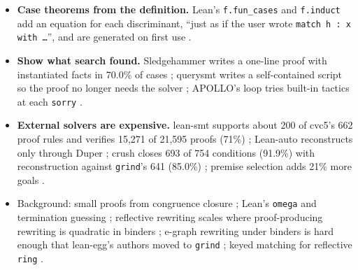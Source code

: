 \documentclass[11pt,a4paper]{article}
\newcommand{\code}[1]{\texttt{#1}}
\begin{document}
\begin{itemize}
  \item \textbf{Case theorems from the definition.} Lean's \code{f.fun\_cases} and
    \code{f.induct} add an equation for each discriminant, ``just as if the user wrote
    \code{match h : x with \ldots}'', and are generated on first use \cite{lean2026funind}.
  \item \textbf{Show what search found.} Sledgehammer writes a one-line proof with
    instantiated facts in 70.0\% of cases \cite{bartl2025instantiations}; querysmt writes a
    self-contained script so the proof no longer needs the solver \cite{clune2026hint};
    APOLLO's loop tries built-in tactics at each \code{sorry} \cite{ospanov2025apollo}.
  \item \textbf{External solvers are expensive.} lean-smt supports about 200 of cvc5's 662
    proof rules and verifies 15,271 of 21,595 proofs (71\%) \cite{mohamed2025leansmt};
    Lean-auto reconstructs only through Duper \cite{qian2025leanauto,clune2024duper}; crush
    closes 693 of 754 conditions (91.9\%) with reconstruction against \code{grind}'s 641
    (85.0\%) \cite{he2026crush}; premise selection adds 21\% more goals
    \cite{zhu2026premise}.
  \item Background: small proofs from congruence closure \cite{flatt2022small}; Lean's
    \code{omega} \cite{lean2026omega} and termination guessing \cite{lean2026guesslex};
    reflective rewriting scales where proof-producing rewriting is quadratic in binders
    \cite{gross2022rewriting}; e-graph rewriting under binders is hard enough that lean-egg's
    authors moved to \code{grind} \cite{rossel2024egraphs}; keyed matching for reflective
    \code{ring} \cite{sakaguchi2022reflexive}.
\end{itemize}
\end{document}
